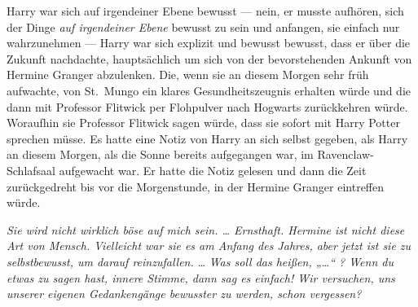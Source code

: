 Harry war sich auf irgendeiner Ebene bewusst — nein, er musste aufhören, sich der Dinge \emph{auf irgendeiner Ebene} bewusst zu sein und anfangen, sie einfach nur wahrzunehmen — Harry war sich explizit und bewusst bewusst, dass er über die Zukunft nachdachte, hauptsächlich um sich von der bevorstehenden Ankunft von Hermine Granger abzulenken. Die, wenn sie an diesem Morgen sehr früh aufwachte, von St.~Mungo ein klares Gesundheitszeugnis erhalten würde und die dann mit Professor Flitwick per Flohpulver nach Hogwarts zurückkehren würde. Woraufhin sie Professor Flitwick sagen würde, dass sie sofort mit Harry Potter sprechen müsse. Es hatte eine Notiz von Harry an sich selbst gegeben, als Harry an diesem Morgen, als die Sonne bereits aufgegangen war, im Ravenclaw-Schlafsaal aufgewacht war. Er hatte die Notiz gelesen und dann die Zeit zurückgedreht bis vor die Morgenstunde, in der Hermine Granger eintreffen würde.

\emph{Sie wird nicht wirklich böse auf mich sein. … Ernsthaft. Hermine ist nicht diese Art von Mensch. Vielleicht war sie es am Anfang des Jahres, aber jetzt ist sie zu selbstbewusst, um darauf reinzufallen.}
\emph{…}
\emph{Was soll das heißen, „…“ ? Wenn du etwas zu sagen hast, innere Stimme, dann sag es einfach! Wir versuchen, uns unserer eigenen Gedankengänge bewusster zu werden, schon vergessen?}

\later

